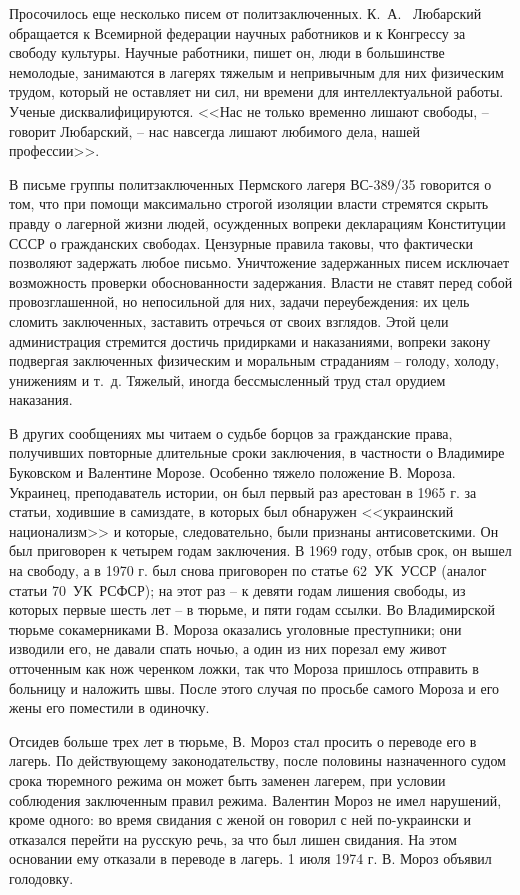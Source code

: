\documentclass{book}
\begin{document}
Просочилось еще несколько писем от политзаключенных. К.~А.~	Любарский обращается к Всемирной федерации научных работников и к Конгрессу за свободу культуры. Научные работники, пишет он, люди в большинстве немолодые, занимаются в лагерях тяжелым и непривычным для них физическим трудом, который не оставляет ни сил, ни времени для интеллектуальной работы. Ученые дисквалифицируются. <<Нас не только временно лишают свободы, -- говорит Любарский, -- нас навсегда лишают любимого дела, нашей профессии>>.

В письме группы политзаключенных Пермского лагеря ВС-389/35 говорится о том, что при помощи максимально строгой изоляции власти стремятся скрыть правду о лагерной жизни людей, осужденных вопреки декларациям Конституции СССР о гражданских свободах. Цензурные правила таковы, что фактически позволяют задержать любое письмо. Уничтожение задержанных писем исключает возможность проверки обоснованности задержания. Власти не ставят перед собой провозглашенной, но непосильной для них, задачи переубеждения: их цель   сломить заключенных, заставить отречься от своих взглядов. Этой цели администрация стремится достичь придирками и наказаниями, вопреки закону подвергая заключенных физическим и моральным страданиям -- голоду, холоду, унижениям и т.~д. Тяжелый, иногда бессмысленный труд стал орудием наказания.

В других сообщениях мы читаем о судьбе борцов за гражданские права, получивших повторные длительные сроки заключения, в частности о Владимире Буковском и Валентине Морозе. Особенно тяжело положение В. Мороза. Украинец, преподаватель истории, он был первый раз арестован в 1965 г. за статьи, ходившие в самиздате, в которых был обнаружен <<украинский национализм>> и которые, следовательно, были признаны антисоветскими. Он был приговорен к четырем годам заключения. В 1969 году, отбыв срок, он вышел на свободу, а в 1970 г. был снова приговорен по статье 62~УК~УССР (аналог статьи 70~УК~РСФСР); на этот раз -- к девяти годам лишения свободы, из которых первые шесть лет -- в тюрьме, и пяти годам ссылки. Во Владимирской тюрьме сокамерниками В. Мо­роза оказались уголовные преступники; они изводили его, не давали спать ночью, а один из них порезал ему живот отточенным как нож черенком ложки, так что Мороза пришлось отпра­вить в больницу и наложить швы. После этого случая по просьбе самого Мороза и его жены его поместили 
в 
одиночку.

Отсидев больше трех лет в тюрьме, В. Мороз стал просить о переводе его в лагерь. По действующему законодательству, после половины назначенного судом срока тюремного режима он может быть заменен лагерем, при условии соблюдения заключенным правил режима. Валентин Мороз не имел нарушений, кроме одного: во время свидания с женой он говорил с ней по-украински и отказался перейти на русскую речь, за что был лишен свидания. На этом основании ему отказали в переводе в лагерь. 1 июля 1974 г. В. Мороз объявил голодовку.
\end{document}
